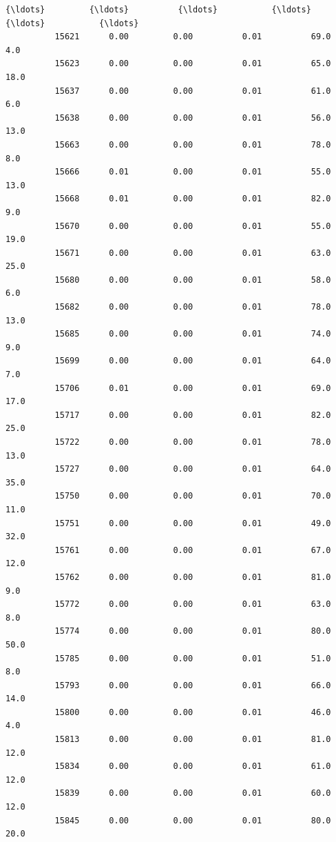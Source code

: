\documentclass[11pt]{article}
\begin{document}
\begin{Verbatim}[commandchars=\\\{\}]
          {\ldots}         {\ldots}          {\ldots}           {\ldots}           {\ldots}           {\ldots}   
          15621      0.00         0.00          0.01          69.0           4.0   
          15623      0.00         0.00          0.01          65.0          18.0   
          15637      0.00         0.00          0.01          61.0           6.0   
          15638      0.00         0.00          0.01          56.0          13.0   
          15663      0.00         0.00          0.01          78.0           8.0   
          15666      0.01         0.00          0.01          55.0          13.0   
          15668      0.01         0.00          0.01          82.0           9.0   
          15670      0.00         0.00          0.01          55.0          19.0   
          15671      0.00         0.00          0.01          63.0          25.0   
          15680      0.00         0.00          0.01          58.0           6.0   
          15682      0.00         0.00          0.01          78.0          13.0   
          15685      0.00         0.00          0.01          74.0           9.0   
          15699      0.00         0.00          0.01          64.0           7.0   
          15706      0.01         0.00          0.01          69.0          17.0   
          15717      0.00         0.00          0.01          82.0          25.0   
          15722      0.00         0.00          0.01          78.0          13.0   
          15727      0.00         0.00          0.01          64.0          35.0   
          15750      0.00         0.00          0.01          70.0          11.0   
          15751      0.00         0.00          0.01          49.0          32.0   
          15761      0.00         0.00          0.01          67.0          12.0   
          15762      0.00         0.00          0.01          81.0           9.0   
          15772      0.00         0.00          0.01          63.0           8.0   
          15774      0.00         0.00          0.01          80.0          50.0   
          15785      0.00         0.00          0.01          51.0           8.0   
          15793      0.00         0.00          0.01          66.0          14.0   
          15800      0.00         0.00          0.01          46.0           4.0   
          15813      0.00         0.00          0.01          81.0          12.0   
          15834      0.00         0.00          0.01          61.0          12.0   
          15839      0.00         0.00          0.01          60.0          12.0   
          15845      0.00         0.00          0.01          80.0          20.0   
          

\end{Verbatim}
\end{document}

